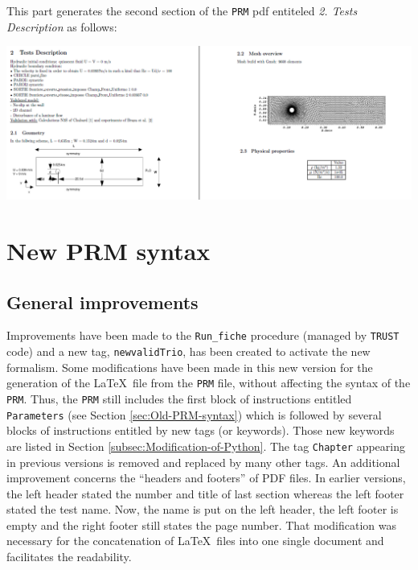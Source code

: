This part generates the second section of the \texttt{PRM} pdf entiteled \textit{2. Tests Description} as follows:\newline
\begin{center}\includegraphics[width=15cm]{tools/chapter_PRM_1_pdf.png}\end{center}
\begin{center}\end{center}

\section{\label{sec:New-PRM-syntax}New \textsf{PRM} syntax}

\subsection{\label{subsec:General-improvements}General improvements}
Improvements have been made to the \texttt{Run\_fiche} procedure (managed
by \texttt{TRUST} code) and a new tag, \texttt{newvalidTrio}, has
been created to activate the new formalism. Some modifications have
been made in this new version for the generation of the \LaTeX~file from
the \texttt{PRM} file, without affecting the syntax of the \texttt{PRM}.
Thus, the \texttt{PRM} still includes the first block of instructions
entitled \texttt{Parameters} (see Section \ref{sec:Old-PRM-syntax})
which is followed by several blocks of instructions entitled by new
tags (or keywords). Those new keywords are listed in Section \ref{subsec:Modification-of-Python}.
The tag \texttt{Chapter} appearing in previous versions is removed and replaced
by many other tags. An additional improvement concerns the ``headers
and footers'' of PDF files. In earlier versions, the left header stated
the number and title of last section whereas the left footer stated
the test name. Now, the name is put on the left header, the left footer
is empty and the right footer still states the page number. That modification
was necessary for the concatenation of \LaTeX~files into one single
document and facilitates the readability.

